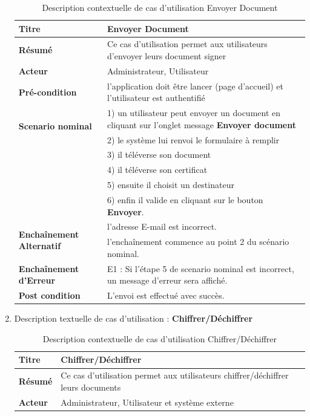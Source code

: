 \begin{enumerate}
				\begin{table}[H]
				\centering
					\caption{Description contextuelle de cas d'utilisation Envoyer Document}
				\begin{tabular}{|l|p{11cm}|}
					\hline 
						\textbf{Titre} & Envoyer Document \\ 
					\hline 
						\textbf{Résumé} & Ce cas d'utilisation permet aux utilisateurs d'envoyer leurs document signer \\ 
					\hline 
						\textbf{Acteur} & Administrateur, Utilisateur \\ 
			
					\hline 
						\textbf{Pré-condition} & l'application doit être lancer (page d'accueil) et l'utilisateur est authentifié  \\ 
					\hline 
						\multirow{2}{*}{\textbf{Scenario nominal}} & 1) un utilisateur peut envoyer un document en cliquant sur l'onglet message \textbf{Envoyer document} \\
							 & 2) le système lui renvoi le formulaire à remplir \\
							 & 3) il téléverse son document \\
							 & 4) il téléverse son certificat\\
							 & 5) ensuite il choisit un destinateur\\
							 & 6) enfin il valide en cliquant sur le bouton \textbf{Envoyer}.\\
					\hline 
					
						\multirow{2}{*}{\textbf{Enchaînement Alternatif}} & l'adresse E-mail est incorrect. \\
							  & l'enchaînement commence au point 2 du scénario nominal. \\
							
					\hline 
						\textbf{Enchaînement d'Erreur} & E1 : Si l'étape 5 de scenario nominal est incorrect, un message d'erreur sera affiché. \\
					\hline
						\textbf{Post condition} & L'envoi est effectué avec succès.\\
					\hline
					\end{tabular} 
				\end{table} 
				
				\item Description textuelle de cas d'utilisation : \textbf{Chiffrer/Déchiffrer}

				\begin{table}[H]
				\centering
					\caption{Description contextuelle de cas d'utilisation Chiffrer/Déchiffrer}
				\begin{tabular}{|l|p{11cm}|}
					\hline 
						\textbf{Titre} & Chiffrer/Déchiffrer \\ 
					\hline 
						\textbf{Résumé} & Ce cas d'utilisation permet aux utilisateurs chiffrer/déchiffrer leurs documents \\ 
					\hline 
						\textbf{Acteur} & Administrateur, Utilisateur et système externe \\ 
			

\end{tabular}
\end{table}
\end{enumerate}
